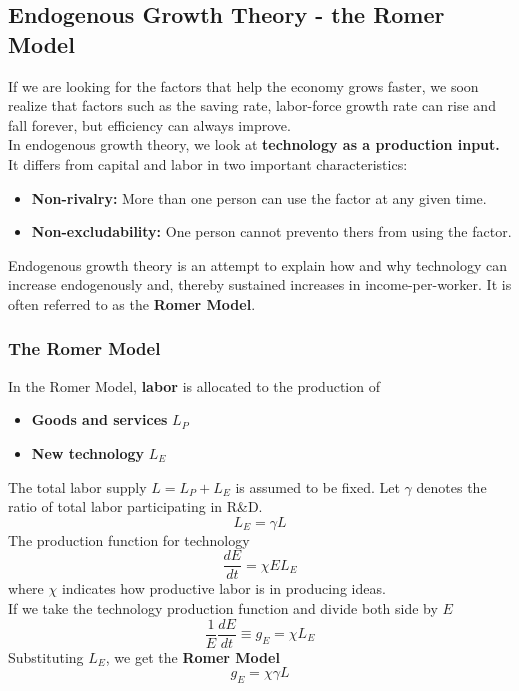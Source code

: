 \documentclass[a4paper]{article}
\begin{document}
\subsection{Endogenous Growth Theory - the Romer Model}
If we are looking for the factors that help the economy grows faster, we soon 
realize that factors such as the saving rate, labor-force growth rate can rise 
and fall forever, but efficiency can always improve. \smallskip \\
In endogenous growth theory, we look at \textbf{technology as a 
production input.} It differs from capital and labor in two important 
characteristics: \begin{itemize}
    \item \textbf{Non-rivalry: } More than one person can use the factor 
    at any given time.
    \item \textbf{Non-excludability: } One person cannot prevento thers 
    from using the factor.
\end{itemize}
Endogenous growth theory is an attempt to explain how 
and why technology can increase
endogenously and, thereby sustained increases in income-per-worker. 
It is often referred to as the \textbf{Romer Model}.

\subsubsection*{The Romer Model}
In the Romer Model, \textbf{labor} is allocated to the production of \begin{itemize}
    \item \textbf{Goods and services} $L_P$
    \item \textbf{New technology} $L_E$
\end{itemize}
The total labor supply $L  = L_P + L_E$ is assumed to be fixed. Let $\gamma$ 
denotes the ratio of total labor participating in R\&D.
\[ L_E = \gamma L \]
The production function for technology
\[ \frac{dE}{dt} = \chi E L_E \]
where $\chi$ indicates how productive labor is in producing ideas. \smallskip \\
%
If we take the technology production function and divide both side by $E$
\[ \frac{1}{E}\frac{dE}{dt} \equiv g_E = \chi L_E \]
Substituting $L_E$, we get the \textbf{Romer Model}
\[ \boxed{g_E = \chi \gamma L} \]
%
\end{document}
